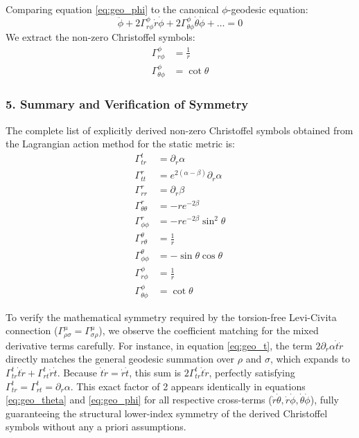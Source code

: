 \documentclass[11pt, a4paper]{report}
\begin{document}
Comparing equation \eqref{eq:geo_phi} to the canonical $\phi$-geodesic equation:
\begin{equation}
    \ddot{\phi} + 2\Gamma^\phi_{r\phi}\dot{r}\dot{\phi} + 2\Gamma^\phi_{\theta\phi}\dot{\theta}\dot{\phi} + \dots = 0
\end{equation}
We extract the non-zero Christoffel symbols:
\begin{align}
    \Gamma^\phi_{r\phi} &= \frac{1}{r} \\
    \Gamma^\phi_{\theta\phi} &= \cot\theta
\end{align}

\subsubsection*{5. Summary and Verification of Symmetry}

The complete list of explicitly derived non-zero Christoffel symbols obtained from the Lagrangian action method for the static metric is:
\begin{align}
    \Gamma^t_{tr} &= \partial_r \alpha \\
    \Gamma^r_{tt} &= e^{2(\alpha - \beta)} \partial_r \alpha \\
    \Gamma^r_{rr} &= \partial_r \beta \\
    \Gamma^r_{\theta\theta} &= -r e^{-2\beta} \\
    \Gamma^r_{\phi\phi} &= -r e^{-2\beta} \sin^2\theta \\
    \Gamma^\theta_{r\theta} &= \frac{1}{r} \\
    \Gamma^\theta_{\phi\phi} &= -\sin\theta \cos\theta \\
    \Gamma^\phi_{r\phi} &= \frac{1}{r} \\
    \Gamma^\phi_{\theta\phi} &= \cot\theta
\end{align}

To verify the mathematical symmetry required by the torsion-free Levi-Civita connection ($\Gamma^\mu_{\rho\sigma} = \Gamma^\mu_{\sigma\rho}$), we observe the coefficient matching for the mixed derivative terms carefully. For instance, in equation \eqref{eq:geo_t}, the term $2\partial_r \alpha \dot{t}\dot{r}$ directly matches the general geodesic summation over $\rho$ and $\sigma$, which expands to $\Gamma^t_{tr}\dot{t}\dot{r} + \Gamma^t_{rt}\dot{r}\dot{t}$. Because $\dot{t}\dot{r} = \dot{r}\dot{t}$, this sum is $2\Gamma^t_{tr}\dot{t}\dot{r}$, perfectly satisfying $\Gamma^t_{tr} = \Gamma^t_{rt} = \partial_r \alpha$. This exact factor of 2 appears identically in equations \eqref{eq:geo_theta} and \eqref{eq:geo_phi} for all respective cross-terms ($\dot{r}\dot{\theta}, \dot{r}\dot{\phi}, \dot{\theta}\dot{\phi}$), fully guaranteeing the structural lower-index symmetry of the derived Christoffel symbols without any a priori assumptions.
\end{document}
